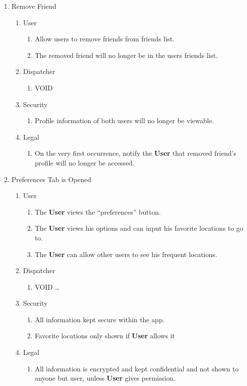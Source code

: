 \documentclass[english]{article}
\begin{document}
\begin{enumerate}[{BE}1.]
	\item Remove Friend
	\begin{enumerate}[{VP9}.1]
		\item User
			\begin{enumerate}
				\item Allow users to remove friends from friends list.
				\item The removed friend will no longer be in the users friends list.
			\end{enumerate}
		\item Dispatcher
			\begin{enumerate}
				\item VOID
			\end{enumerate}
		\item Security
			\begin{enumerate}
				\item Profile information of both users will no longer be viewable.
			\end{enumerate}
		\item Legal
			\begin{enumerate}
				\item On the very first occurrence, notify the \textbf{User} that removed friend's profile will no longer be accessed.
			\end{enumerate}
	\end{enumerate}
	
	\item Preferences Tab is Opened
	\begin{enumerate}[{VP10}.1]
		\item User
		\begin{enumerate}
			\item The \textbf{User} views the “preferences” button.
			\item The \textbf{User} views his options and can input his favorite locations to go to.
			\item The \textbf{User} can allow other users to see his frequent locations.
		\end{enumerate}
		\item Dispatcher
		\begin{enumerate}
			\item VOID
			 \dots
		\end{enumerate}
		\item Security
		\begin{enumerate}
			\item All information kept secure within the app.
			\item Favorite locations only shown if \textbf{User} allows it
		\end{enumerate}
		\item Legal
		\begin{enumerate}
			\item All information is encrypted and kept confidential and not shown to anyone but user, unless \textbf{User} gives permission.
		\end{enumerate}
	\end{enumerate}
	

\end{enumerate}
\end{document}
